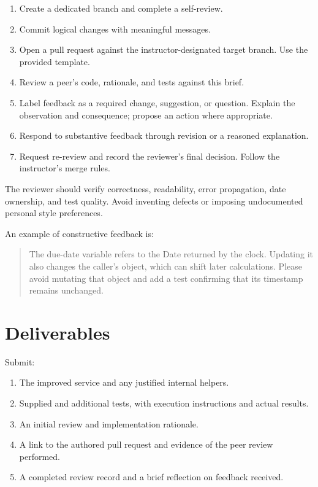 \documentclass[
  11pt,
]{article}
\providecommand{\tightlist}{%
  \setlength{\itemsep}{0pt}\setlength{\parskip}{0pt}}
\begin{document}
\begin{enumerate}
\def\labelenumi{\arabic{enumi}.}
\tightlist
\item
  Create a dedicated branch and complete a self-review.
\item
  Commit logical changes with meaningful messages.
\item
  Open a pull request against the instructor-designated target branch.
  Use the provided template.
\item
  Review a peer's code, rationale, and tests against this brief.
\item
  Label feedback as a required change, suggestion, or question. Explain
  the observation and consequence; propose an action where appropriate.
\item
  Respond to substantive feedback through revision or a reasoned
  explanation.
\item
  Request re-review and record the reviewer's final decision. Follow the
  instructor's merge rules.
\end{enumerate}

The reviewer should verify correctness, readability, error propagation,
date ownership, and test quality. Avoid inventing defects or imposing
undocumented personal style preferences.

An example of constructive feedback is:

\begin{quote}
The due-date variable refers to the Date returned by the clock. Updating
it also changes the caller's object, which can shift later calculations.
Please avoid mutating that object and add a test confirming that its
timestamp remains unchanged.
\end{quote}

\hypertarget{deliverables}{%
\section{Deliverables}\label{deliverables}}

Submit:

\begin{enumerate}
\def\labelenumi{\arabic{enumi}.}
\tightlist
\item
  The improved service and any justified internal helpers.
\item
  Supplied and additional tests, with execution instructions and actual
  results.
\item
  An initial review and implementation rationale.
\item
  A link to the authored pull request and evidence of the peer review
  performed.
\item
  A completed review record and a brief reflection on feedback received.
\end{enumerate}
\end{document}
